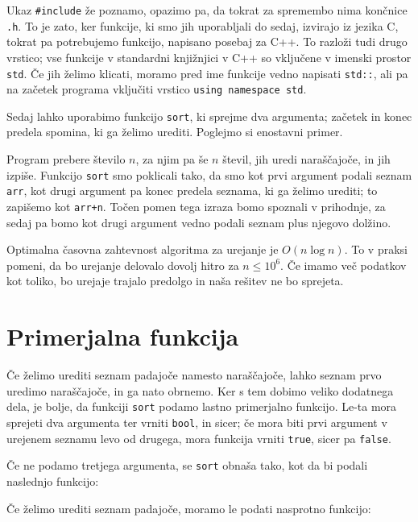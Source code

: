 \documentclass{book}
\begin{document}

Ukaz \verb+#include+ že poznamo, opazimo pa, da tokrat za spremembo nima končnice
\verb+.h+. To je zato, ker funkcije, ki smo jih uporabljali do sedaj, izvirajo
iz jezika C, tokrat pa potrebujemo funkcijo, napisano posebaj za C++. To razloži
tudi drugo vrstico; vse funkcije v standardni knjižnjici v C++ so vključene
v imenski prostor \verb+std+. Če jih želimo klicati, moramo pred ime funkcije
vedno napisati \verb+std::+, ali pa na začetek programa vključiti vrstico
\verb+using namespace std+.

Sedaj lahko uporabimo funkcijo \verb+sort+, ki sprejme dva argumenta;
začetek in konec predela spomina, ki ga želimo urediti. Poglejmo si enostavni
primer.



Program prebere število \(n\), za njim pa še \(n\) števil, jih uredi naraščajoče,
in jih izpiše. Funkcijo \verb+sort+ smo poklicali tako, da smo kot prvi argument
podali seznam \verb+arr+, kot drugi argument pa konec predela seznama, ki ga
želimo urediti; to zapišemo kot \verb|arr+n|. Točen pomen tega izraza bomo
spoznali v prihodnje, za sedaj pa bomo kot drugi argument vedno podali seznam
plus njegovo dolžino.

Optimalna časovna zahtevnost algoritma za urejanje je \(O(n \log n)\). To v praksi
pomeni, da bo urejanje delovalo dovolj hitro za \(n \le 10^6\). Če imamo več
podatkov kot toliko, bo urejaje trajalo predolgo in naša rešitev ne bo sprejeta.

\section{Primerjalna funkcija}

Če želimo urediti seznam padajoče namesto naraščajoče, lahko seznam prvo uredimo
naraščajoče, in ga nato obrnemo. Ker s tem dobimo veliko dodatnega dela, je
bolje, da funkciji \verb+sort+ podamo lastno primerjalno funkcijo. Le-ta mora
sprejeti dva argumenta ter vrniti \verb+bool+, in sicer; če mora biti prvi
argument v urejenem seznamu levo od drugega, mora funkcija vrniti \verb+true+,
sicer pa \verb+false+.

Če ne podamo tretjega argumenta, se \verb+sort+ obnaša tako, kot da bi podali
naslednjo funkcijo:


Če želimo urediti seznam padajoče, moramo le podati nasprotno funkcijo:
\end{document}
